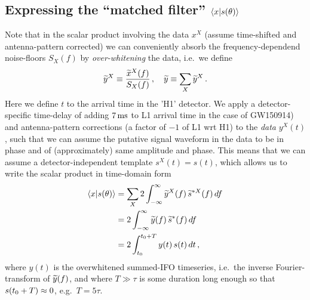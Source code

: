 \documentclass[aps,prd,onecolumn,notitlepage,nofootinbib,superscriptaddress,altaffilletter,floatfix]{revtex4-1}
\begin{document}
\subsection{Expressing the ``matched filter'' $\langle x|s(\theta)\rangle$}
\label{sec:computing-scalarxs}

Note that in the scalar product involving the data $x^X$ (assume time-shifted and antenna-pattern corrected) we can conveniently absorb the
frequency-dependend noise-floors $S_X(f)$ by \emph{over-whitening} the data, i.e.\ we define
\begin{equation}
  \label{eq:12}
  \widetilde{y}^X \equiv \frac{\widetilde{x}^X(f)}{S_X(f)}\,,\quad
  \widetilde{y} \equiv \sum_X \widetilde{y}^X\,.
\end{equation}
Here we define $t$ to the arrival time in the 'H1' detector.
We apply a detector-specific time-delay of adding $7\,\mathrm{ms}$ to L1 arrival time in the case of GW150914) and
antenna-pattern corrections (a factor of $-1$ of L1 wrt H1) to the \emph{data} $y^X(t)$, such that we can assume the putative signal waveform in the
data to be in phase and of (approximately) same amplitude and phase. This means that we can assume a detector-independent template $s^X(t) = s(t)$,
which allows us to write the scalar product in time-domain form
\begin{align}
  \label{eq:13}
  \langle x|s(\theta)\rangle &= \sum_X 2\int_{-\infty}^{\infty} \widetilde{y}^X(f)\,\widetilde{s}^{*X}(f)\,df \\
  &= 2\int_{-\infty}^{\infty} \widetilde{y}(f)\,\widetilde{s}^{*}(f)\,df \\
  &=  2\int_{t_0}^{t_0 + T} y(t)\,s(t)\,dt\,,
\end{align}
where $y(t)$ is the overwhitened summed-IFO timeseries, i.e.\ the inverse Fourier-transform of $\widetilde{y}(f)$, and
where $T \gg \tau$ is some duration long enough so that $s(t_0+T)\approx0$, e.g.\ $T=5\tau$.
\end{document}
